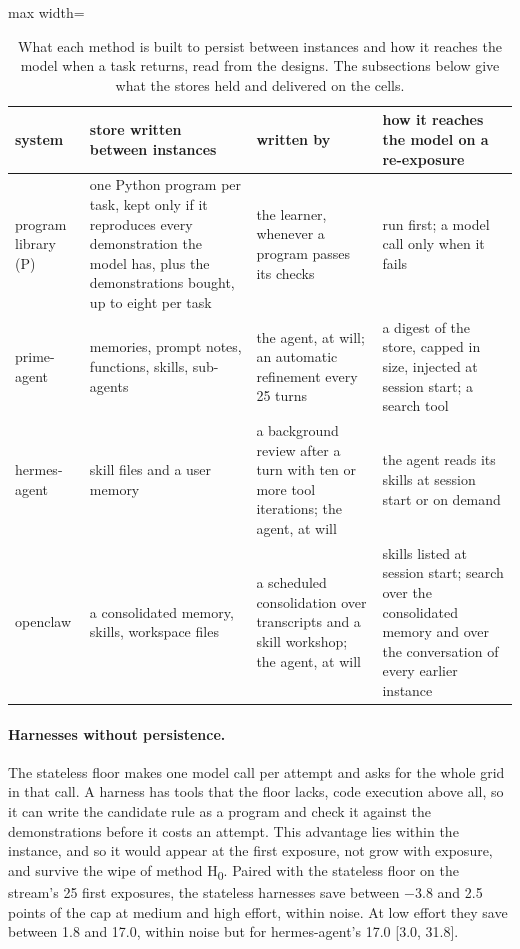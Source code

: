 \begin{table}[htbp]
\centering
\footnotesize
\begin{adjustbox}{max width=\linewidth}
\begin{tabular}{@{}p{2.2cm}p{4.2cm}p{3.6cm}p{3.8cm}@{}}
\toprule
system & store written between instances & written by & how it reaches the model on a re-exposure \\
\midrule
program library (P) & one Python program per task, kept only if it reproduces every demonstration the model has, plus the demonstrations bought, up to eight per task & the learner, whenever a program passes its checks & run first; a model call only when it fails \\
prime-agent & memories, prompt notes, functions, skills, sub-agents & the agent, at will; an automatic refinement every 25 turns & a digest of the store, capped in size, injected at session start; a search tool \\
hermes-agent & skill files and a user memory & a background review after a turn with ten or more tool iterations; the agent, at will & the agent reads its skills at session start or on demand \\
openclaw & a consolidated memory, skills, workspace files & a scheduled consolidation over transcripts and a skill workshop; the agent, at will & skills listed at session start; search over the consolidated memory and over the conversation of every earlier instance \\
\bottomrule
\end{tabular}
\end{adjustbox}
\caption{What each method is built to persist between instances and how it reaches the model when a task returns, read from the designs. The subsections below give what the stores held and delivered on the cells.}
\label{tab:persist}
\end{table}

\paragraph{Harnesses without persistence.}
The stateless floor makes one model call per attempt and asks for the whole grid in that call. A harness has tools that the floor lacks, code execution above all, so it can write the candidate rule as a program and check it against the demonstrations before it costs an attempt. This advantage lies within the instance, and so it would appear at the first exposure, not grow with exposure, and survive the wipe of method H\textsubscript{0}. Paired with the stateless floor on the stream's 25 first exposures, the stateless harnesses save between $-3.8$ and 2.5 points of the cap at medium and high effort, within noise. At low effort they save between 1.8 and 17.0, within noise but for hermes-agent's 17.0 [3.0, 31.8].

